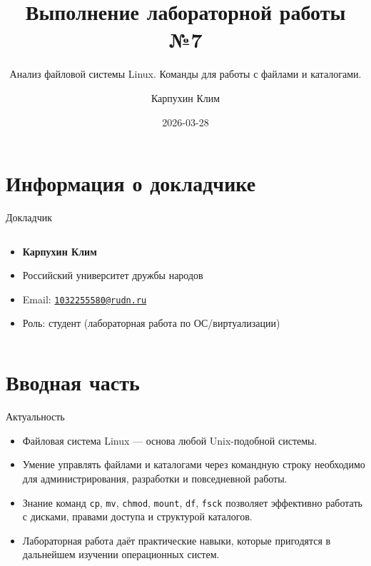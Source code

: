 \documentclass[
  ignorenonframetext,
  aspectratio=169,
  russian,
  aspectratio=169]{beamer}
\title{\texorpdfstring{Выполнение лабораторной работы
№7}{Выполнение лабораторной работы №7}}
\subtitle{\texorpdfstring{Анализ файловой системы Linux. Команды для
работы с файлами и
каталогами.}{Анализ файловой системы Linux. Команды для работы с файлами и каталогами.}}
\author{Карпухин Клим}
\date{2026-03-28}
\providecommand{\tightlist}{%
  \setlength{\itemsep}{0pt}\setlength{\parskip}{0pt}}
\begin{document}
\frame{\titlepage}


\section{Информация о
докладчике}\label{ux438ux43dux444ux43eux440ux43cux430ux446ux438ux44f-ux43e-ux434ux43eux43aux43bux430ux434ux447ux438ux43aux435}

\begin{frame}{Докладчик}
\protect{}\label{ux434ux43eux43aux43bux430ux434ux447ux438ux43a}
\begin{columns}[c]
\begin{column}{0.65\linewidth}
\begin{itemize}[<+->]
\tightlist
\item
  \textbf{Карпухин Клим}
\item
  Российский университет дружбы народов
\item
  Email:
  \href{mailto:1032255580@rudn.ru}{\nolinkurl{1032255580@rudn.ru}}
\item
  Роль: студент (лабораторная работа по ОС/виртуализации)
\end{itemize}
\end{column}
\end{columns}
\end{frame}

\section{Вводная
часть}\label{ux432ux432ux43eux434ux43dux430ux44f-ux447ux430ux441ux442ux44c}

\begin{frame}[fragile]{Актуальность}
\protect{}\label{ux430ux43aux442ux443ux430ux43bux44cux43dux43eux441ux442ux44c}
\begin{itemize}[<+->]
\tightlist
\item
  Файловая система Linux --- основа любой Unix-подобной системы.
\item
  Умение управлять файлами и каталогами через командную строку
  необходимо для администрирования, разработки и повседневной работы.
\item
  Знание команд \texttt{cp}, \texttt{mv}, \texttt{chmod},
  \texttt{mount}, \texttt{df}, \texttt{fsck} позволяет эффективно
  работать с дисками, правами доступа и структурой каталогов.
\item
  Лабораторная работа даёт практические навыки, которые пригодятся в
  дальнейшем изучении операционных систем.
\end{itemize}
\end{frame}
\end{document}
